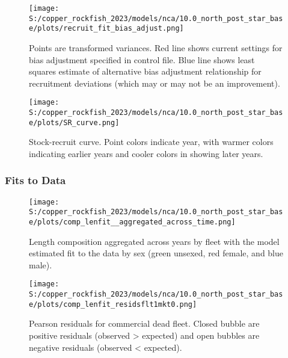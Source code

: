 \documentclass[11pt,
  letterpaper,
]{article}
\begin{document}
\pagebreak

\begin{figure}
{\centering
\texttt{[image: S:/copper\_rockfish\_2023/models/nca/10.0\_north\_post\_star\_base/plots/recruit\_fit\_bias\_adjust.png]}
}
\caption{Points are transformed variances. Red line shows current settings for bias adjustment specified in control file. Blue line shows least squares estimate of alternative bias adjustment relationship for recruitment deviations (which may or may not be an improvement).\label{fig:bias-adjust}}
\end{figure}

\newpage

\begin{figure}
{\centering
\texttt{[image: S:/copper\_rockfish\_2023/models/nca/10.0\_north\_post\_star\_base/plots/SR\_curve.png]}
}
\caption{Stock-recruit curve. Point colors indicate year, with warmer colors indicating earlier years and cooler colors in showing later years.\label{fig:bh-curve}}
\end{figure}

\pagebreak

\subsubsection{Fits to Data}\label{fits-to-data}

\begin{figure}
{\centering
\texttt{[image: S:/copper\_rockfish\_2023/models/nca/10.0\_north\_post\_star\_base/plots/comp\_lenfit\_\_aggregated\_across\_time.png]}
}
\caption{Length composition aggregated across years by fleet with the model estimated fit to the data by sex (green unsexed, red female, and blue male).\label{fig:len-agg-fit}}
\end{figure}

\pagebreak

\begin{figure}
{\centering
\texttt{[image: S:/copper\_rockfish\_2023/models/nca/10.0\_north\_post\_star\_base/plots/comp\_lenfit\_residsflt1mkt0.png]}
}
\caption{Pearson residuals for commercial dead fleet. Closed bubble are positive residuals (observed > expected) and open bubbles are negative residuals (observed < expected).\label{fig:com-dead-pearson}}
\end{figure}
\end{document}
